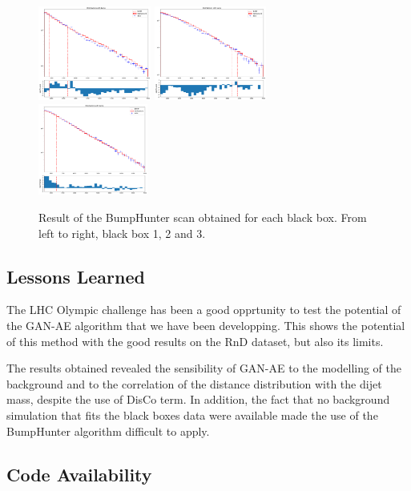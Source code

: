 \documentclass[letterpaper,11pt]{article}
\begin{document}
\begin{figure}[h!]
\centering
\includegraphics[width=0.33\textwidth]{img/bump_BB1.pdf}
\includegraphics[width=0.33\textwidth]{img/bump_BB2.pdf}
\includegraphics[width=0.32\textwidth]{img/bump_BB3.pdf}
\caption{Result of the BumpHunter scan obtained for each black box.  From left to right, black box 1, 2 and 3.}
\label{fig:GAE_BB_BH}
\end{figure}

\subsection{Lessons Learned}
\label{sec:lessons}

\noindent The LHC Olympic challenge has been a good opprtunity to test the potential of the GAN-AE algorithm that we have been developping.
This shows the potential of this method with the good results on the RnD dataset, but also its limits.  

\noindent The results obtained revealed the sensibility of GAN-AE to the modelling of the background and to the correlation of the distance distribution with the dijet mass, despite the use of DisCo term.
In addition, the fact that no background simulation that fits the black boxes data were available made the use of the BumpHunter algorithm difficult to apply.  

\subsection{Code Availability}
\label{code:code}
\end{document}
